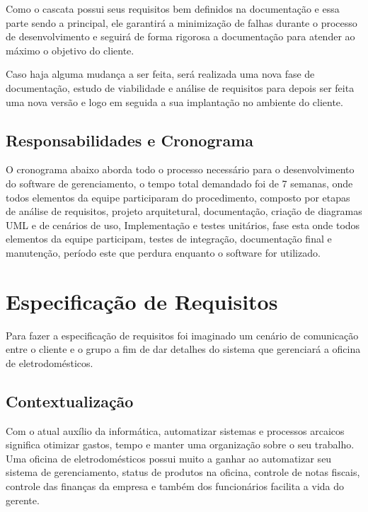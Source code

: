 \documentclass[a4paper,10pt]{article}
\begin{document}
Como o cascata possui seus requisitos bem definidos na documentação e essa parte sendo a principal, ele garantirá a minimização de falhas durante o processo de desenvolvimento e seguirá de forma rigorosa a documentação para atender ao máximo o objetivo do cliente. 

Caso haja alguma mudança a ser feita, será realizada uma nova fase de documentação, estudo de viabilidade e  análise de requisitos para depois ser feita uma nova versão e logo em seguida a sua implantação no ambiente do cliente.

\subsection{Responsabilidades e Cronograma}

O cronograma abaixo aborda todo o processo necessário para o desenvolvimento do software de gerenciamento, o tempo total demandado foi de 7 semanas, onde todos elementos da equipe participaram do procedimento, composto por  etapas de análise de requisitos, projeto arquitetural, documentação, criação de diagramas UML e de cenários de uso, Implementação e testes unitários, fase esta onde todos elementos da equipe participam, testes de integração, documentação final e manutenção, período este que perdura enquanto o software for utilizado.


\section{Especificação de Requisitos}

Para fazer a especificação de requisitos foi imaginado um cenário de comunicação entre o cliente e o grupo a fim de dar detalhes do sistema que gerenciará a oficina de eletrodomésticos.	

\subsection{Contextualização}

Com o atual auxílio da informática, automatizar sistemas e processos arcaicos significa otimizar gastos, tempo e manter uma organização sobre o seu trabalho. Uma oficina de eletrodomésticos possui muito a ganhar ao automatizar seu sistema de gerenciamento, status de produtos na oficina, controle de notas fiscais, controle das finanças da empresa e também dos funcionários facilita a vida do gerente. 
\end{document}

